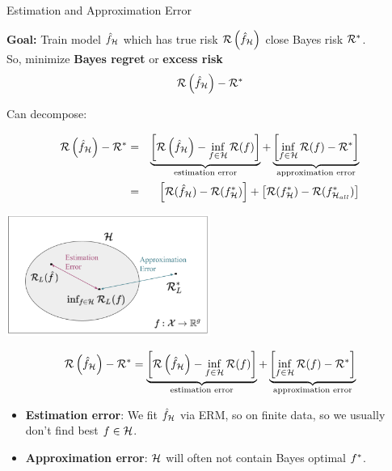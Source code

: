 \documentclass[11pt,compress,t,notes=noshow, xcolor=table]{beamer}
\begin{document}
\begin{vbframe}{Estimation and Approximation Error} 

\textbf{Goal: } Train model $\hat f_{\mathcal{H}}$ which has true risk $\mathcal{R}\left(\hat f_{\mathcal{H}}\right)$ close Bayes risk $\mathcal{R}^\ast$. \\
So, minimize \textbf{Bayes regret} or \textbf{excess risk}
$$
	\mathcal{R}\left(\hat f_{\mathcal{H}}\right) - \mathcal{R}^\ast
$$ 
\lz 

Can decompose: 

\begin{eqnarray*}
	\mathcal{R}\left(\hat f_{\mathcal{H}}\right) - \mathcal{R}^\ast &=& \underbrace{\left[\mathcal{R}\left(\hat f_{\mathcal{H}}\right) - \inf_{f \in \mathcal{H}} \mathcal{R}(f)\right]}_{\text{estimation error}} + \underbrace{\left[\inf_{f \in \mathcal{H}} \mathcal{R}(f) - \mathcal{R}^\ast\right]}_{\text{approximation error}} \\
    &=& \left[\mathcal{R}(\hat{f}_{\mathcal{H}}) - \mathcal{R}(f^{\ast}_{\mathcal{H}})\right] + \left[\mathcal{R}(f^{\ast}_{\mathcal{H}}) - \mathcal{R}(f^{\ast}_{\mathcal{H}_{all}}) \right] 
\end{eqnarray*}

\framebreak 


\begin{center}
\includegraphics[width=0.5\textwidth]{figure_man/risk_minimization_diagram.png}
\end{center}

\vspace{-0.4cm}

$$
	\risk\left(\hat f_{\Hspace}\right) - \riskbayes = \underbrace{\left[\risk\left(\hat f_{\Hspace}\right) - \inf_{f \in \Hspace} \risk(f)\right]}_{\text{estimation error}} + \underbrace{\left[\inf_{f \in \Hspace} \risk(f) - \riskbayes\right]}_{\text{approximation error}} 
    
$$

\vspace{-0.4cm}

\begin{itemize}
\item \textbf{Estimation error}:
We fit $\hat f_{\mathcal{H}}$ via ERM, so on finite data, so we usually don't find best $f \in \mathcal{H}$.
\item \textbf{Approximation error}: 
$\mathcal{H}$ will often not contain Bayes optimal $f^{\ast}$. 
\end{itemize}

\end{vbframe}
\end{document}
